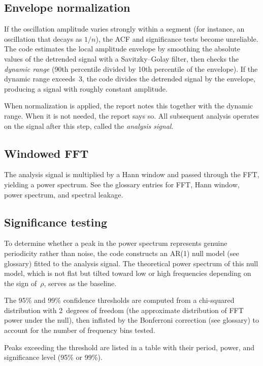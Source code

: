 \documentclass[11pt]{article}
\begin{document}
\subsection{Envelope normalization}

If the oscillation amplitude varies strongly within a segment (for
instance, an oscillation that decays as $1/n$), the ACF and significance
tests become unreliable.  The code estimates the local amplitude envelope
by smoothing the absolute values of the detrended signal with a
Savitzky--Golay filter, then checks the \emph{dynamic range} (90th
percentile divided by 10th percentile of the envelope).  If the dynamic
range exceeds~3, the code divides the detrended signal by the envelope,
producing a signal with roughly constant amplitude.

When normalization is applied, the report notes this together with the
dynamic range.  When it is not needed, the report says so.  All subsequent
analysis operates on the signal after this step, called the
\emph{analysis signal}.

\subsection{Windowed FFT}

The analysis signal is multiplied by a Hann window and passed through the
FFT, yielding a power spectrum.  See the glossary entries for FFT, Hann
window, power spectrum, and spectral leakage.

\subsection{Significance testing}
\label{sec:significance}

To determine whether a peak in the power spectrum represents genuine
periodicity rather than noise, the code constructs an AR(1) null model
(see glossary) fitted to the analysis signal.  The theoretical power
spectrum of this null model, which is not flat but tilted toward low or
high frequencies depending on the sign of~$\rho$, serves as the baseline.

The 95\% and 99\% confidence thresholds are computed from a chi-squared
distribution with 2~degrees of freedom (the approximate distribution of
FFT power under the null), then inflated by the Bonferroni correction
(see glossary) to account for the number of frequency bins tested.

Peaks exceeding the threshold are listed in a table with their period,
power, and significance level (95\% or 99\%).
\end{document}
